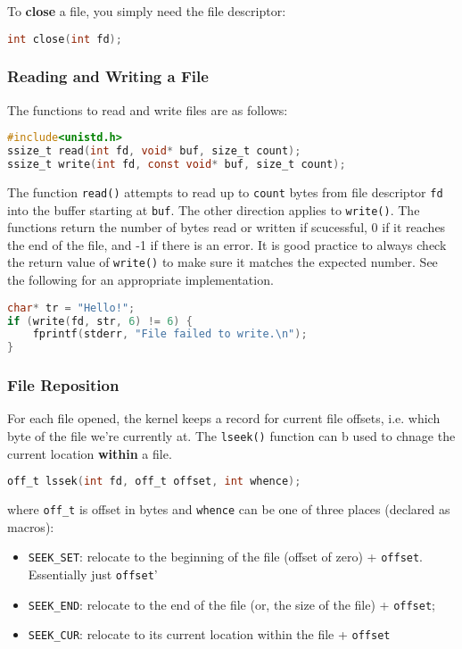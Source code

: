 \documentclass{article}
\newcommand{\bold}[1]{\textbf{#1}}
\renewcommand{\b}{\item[$\circ$]}
\newcommand{\newlist}{\begin{itemize}}
\renewcommand{\endlist}{\end{itemize}}
\newcommand{\code}[1]{\texttt{#1}}
\begin{document}
To \bold{close} a file, you simply need the file descriptor:

\begin{lstlisting}[language=C]
int close(int fd);
\end{lstlisting}

\subsubsection{Reading and Writing a File}

The functions to read and write files are as follows: 

\begin{lstlisting}[language=C]
#include<unistd.h>
ssize_t read(int fd, void* buf, size_t count);
ssize_t write(int fd, const void* buf, size_t count);
\end{lstlisting}

The function \code{read()} attempts to read up to \code{count} bytes from file descriptor \code{fd} into the buffer starting at \code{buf}. The other direction applies to \code{write()}. The functions return the number of bytes read or written if scucessful, 0 if it reaches the end of the file, and -1 if there is an error. It is good practice to always check the return value of \code{write()} to make sure it matches the expected number. See the following for an appropriate implementation.

\begin{lstlisting}[language=C]
char* tr = "Hello!";
if (write(fd, str, 6) != 6) { 
    fprintf(stderr, "File failed to write.\n");
}
\end{lstlisting}

\subsubsection{File Reposition}

For each file opened, the kernel keeps a record for current file offsets, i.e. which byte of the file we're currently at. The \code{lseek()} function can b used to chnage the current location \bold{within} a file.

\begin{lstlisting}[language=C]
off_t lssek(int fd, off_t offset, int whence);
\end{lstlisting}

where \code{off\_t} is offset in bytes and \code{whence} can be one of three places (declared as macros):

\newlist
\b \code{SEEK\_SET}: relocate to the beginning of the file (offset of zero) + \code{offset}. Essentially just \code{offset}'
\b \code{SEEK\_END}: relocate to the end of the file (or, the size of the file) + \code{offset};
\b \code{SEEK\_CUR}: relocate to its current location within the file + \code{offset}
\endlist
\end{document}
